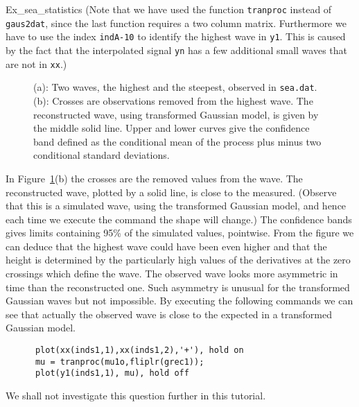 \begin{cex}{Ex_sea_statistics}
\noindent(Note that we have used the function {\tt tranproc} instead of
{\tt gaus2dat}, since the last function requires a two column matrix.
Furthermore we have to use the index {\tt indA-10} to identify
the highest wave in {\tt y1}. This is caused by the fact that the
interpolated signal {\tt yn} has a few additional small waves that
are not in {\tt xx}.)

\begin{figure}
%
\hfill
{}%
\vspace{-3mm}
  \caption[Reconstructing the highest wave in  {\tt sea.dat}]{
(a): Two waves, the highest and the steepest, observed in {\tt sea.dat}.
(b): Crosses are observations removed from the highest wave.
The reconstructed wave,
using transformed Gaussian model, is given by the middle
solid line. Upper and lower curves give the confidence band defined as the
conditional mean of the process plus minus two conditional standard deviations.
}
\label{fig_c_wave}
\end{figure}

In Figure~\ref{fig_c_wave}(b) the crosses are the removed values from
the wave. The reconstructed wave, plotted by a solid line,
is close to the measured. (Observe that this is a simulated
wave, using the transformed Gaussian model,
and hence each time we execute the command the shape will change.)
The confidence bands gives limits containing 95\% of the simulated
values, pointwise.
From the figure  we can deduce that the highest wave could have been
even higher and that the height is determined by the particularly high
values of the derivatives at the zero crossings which define the wave.
The observed wave looks more asymmetric in time than the reconstructed one.
Such asymmetry is unusual for the transformed Gaussian waves but not
impossible. By executing the following commands we can see that actually the
observed wave is close to the expected in a transformed Gaussian model.
{\small\begin{verbatim}
      plot(xx(inds1,1),xx(inds1,2),'+'), hold on
      mu = tranproc(mu1o,fliplr(grec1));
      plot(y1(inds1,1), mu), hold off
\end{verbatim}}
\noindent
We shall not investigate this question further in this tutorial.
\end{cex}

